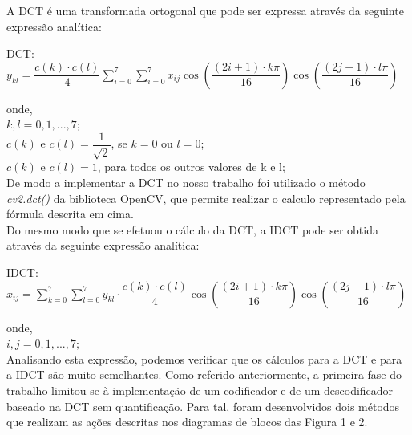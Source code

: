 \documentclass[12pt,a4paper]{article}
\begin{document}
A DCT é uma transformada ortogonal que pode ser expressa através da seguinte expressão analítica:\\
\begin{center}
DCT: $y_{kl} = \dfrac{c(k)\cdot c(l)}{4}\sum\limits_{i=0}^7\sum\limits_{i=0}^7x_{ij}\cos(\dfrac{(2i+1)\cdot k\pi}{16})\cos (\dfrac{(2j+1)\cdot l\pi}{16})$
\end{center}
onde,\\
\indent \indent $k,l = 0,1,...,7;$\\
\indent \indent $c(k)$ e $c(l) = \dfrac{1}{\sqrt{2}}$, se $k=0$ ou $l=0$;\\
\indent \indent $c(k)$ e $c(l) = 1$, para todos os outros valores de k e l;\\

De modo a implementar a DCT no nosso trabalho foi utilizado o método \textit{cv2.dct()} da biblioteca OpenCV, que permite realizar o calculo representado pela fórmula descrita em cima.\\

Do mesmo modo que se efetuou o cálculo da DCT, a IDCT pode ser obtida através da seguinte expressão analítica:\\
\begin{center}
IDCT: $x_{ij} = \sum\limits_{k=0}^7\sum\limits_{l=0}^7y_{kl}\cdot \dfrac{c(k)\cdot c(l)}{4} \cos(\dfrac{(2i+1)\cdot k\pi}{16})\cos (\dfrac{(2j+1)\cdot l\pi}{16})$
\end{center}
onde,\\
\indent \indent $i,j = 0,1,...,7;$\\

Analisando esta expressão, podemos verificar que os cálculos para a DCT e para a IDCT são muito semelhantes.
\newpage
Como referido anteriormente, a primeira fase do trabalho limitou-se à implementação de um codificador e de um descodificador baseado na DCT sem quantificação. Para tal, foram desenvolvidos dois métodos que realizam as ações descritas nos diagramas de blocos das Figura 1 e 2. 
  
\end{document}
